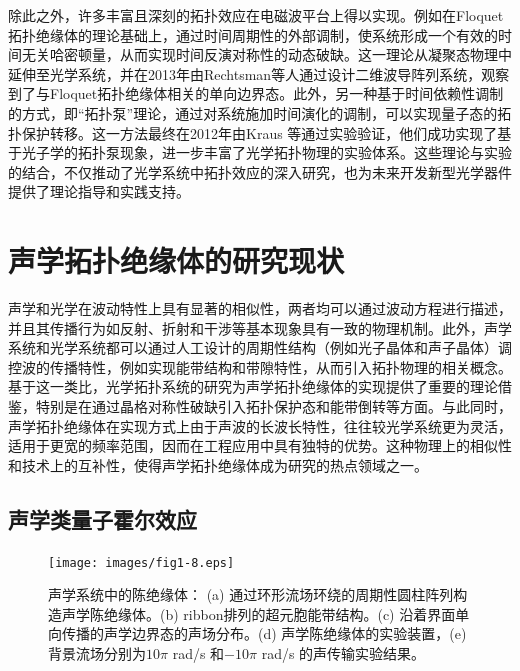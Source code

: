 除此之外，许多丰富且深刻的拓扑效应在电磁波平台上得以实现。例如在Floquet拓扑绝缘体的理论基础上\cite{g4,g5}，通过时间周期性的外部调制，使系统形成一个有效的时间无关哈密顿量，从而实现时间反演对称性的动态破缺。这一理论从凝聚态物理中延伸至光学系统，并在2013年由Rechtsman等人通过设计二维波导阵列系统，观察到了与Floquet拓扑绝缘体相关的单向边界态\cite{g7}。此外，另一种基于时间依赖性调制的方式，即“拓扑泵”理论\cite{g8}，通过对系统施加时间演化的调制，可以实现量子态的拓扑保护转移。这一方法最终在2012年由Kraus 等通过实验验证，他们成功实现了基于光子学的拓扑泵现象，进一步丰富了光学拓扑物理的实验体系\cite{g9}。这些理论与实验的结合，不仅推动了光学系统中拓扑效应的深入研究，也为未来开发新型光学器件提供了理论指导和实践支持\cite{h1,h2,h3,h4,h7,h8,h9,h10,h11,h12,h13,h14,h15,h16}。


\section{声学拓扑绝缘体的研究现状}

声学和光学在波动特性上具有显著的相似性，两者均可以通过波动方程进行描述，并且其传播行为如反射、折射和干涉等基本现象具有一致的物理机制。此外，声学系统和光学系统都可以通过人工设计的周期性结构（例如光子晶体和声子晶体）调控波的传播特性，例如实现能带结构和带隙特性，从而引入拓扑物理的相关概念。基于这一类比，光学拓扑系统的研究为声学拓扑绝缘体的实现提供了重要的理论借鉴，特别是在通过晶格对称性破缺引入拓扑保护态和能带倒转等方面。与此同时，声学拓扑绝缘体在实现方式上由于声波的长波长特性，往往较光学系统更为灵活，适用于更宽的频率范围，因而在工程应用中具有独特的优势。这种物理上的相似性和技术上的互补性，使得声学拓扑绝缘体成为研究的热点领域之一。

\subsection{声学类量子霍尔效应}

\begin{figure}[h!]
    \centering
    \texttt{[image: images/fig1-8.eps]} 
    \caption{声学系统中的陈绝缘体：
    (a) 通过环形流场环绕的周期性圆柱阵列构造声学陈绝缘体。(b) ribbon排列的超元胞能带结构。(c) 沿着界面单向传播的声学边界态的声场分布。(d) 声学陈绝缘体的实验装置\cite{i-add-1}，(e)背景流场分别为$10\pi$ rad/s 和$-10\pi$ rad/s 的声传输实验结果。
    }
    \label{fig_1_8}
\end{figure}

